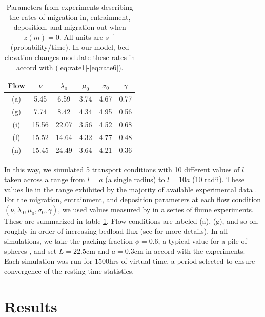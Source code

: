 \documentclass[draft]{agujournal2018}
\begin{document}
\begin{table}
	\caption{Parameters from \citet{Ancey2008} experiments describing the rates of migration in, entrainment, deposition, and migration out when $z(m)=0$. All units are $s^{-1}$ (probability/time). In our model, bed elevation changes modulate these rates in accord with (\ref{eq:rate1}-\ref{eq:rate6}).}\label{tab:anceyparams}
	\begin{tabular}{cccccc} \\ 
		\toprule  
		Flow & $\nu$ & $\lambda_0$ & $\mu_0$ & $\sigma_0$ & $\gamma$ \\
		\midrule
		(a) & 5.45  & 6.59  & 3.74 & 4.67 & 0.77 \\
		\midrule
		(g) & 7.74  & 8.42  & 4.34 & 4.95 & 0.56 \\
		\midrule
		(i) & 15.56 & 22.07 & 3.56 & 4.52 & 0.68 \\
		\midrule
		(l) & 15.52 & 14.64 & 4.32 & 4.77 & 0.48 \\
		\midrule
		(n) & 15.45 & 24.49 & 3.64 & 4.21 & 0.36 \\
		\bottomrule
	\end{tabular}
\end{table} 
In this way, we simulated 5 transport conditions with 10 different values of $l$ taken across a range from $l=a$ (a single radius) to $l=10a$ (10 radii).
These values lie in the range exhibited by the majority of available experimental data \citep{Wong2007,Singh2009,Martin2014}.
For the migration, entrainment, and deposition parameters at each flow condition $(\nu, \lambda_0, \mu_0, \sigma_0, \gamma)$, we used values measured by \citet{Ancey2008} in a series of flume experiments.
These are summarized in table \ref{tab:anceyparams}.
Flow conditions are labeled (a), (g), and so on, roughly in order of increasing bedload flux (see \citet{Ancey2008} for more details). 
In all simulations, we take the packing fraction $\phi = 0.6$, a typical value for a pile of spheres \citep[e.g.,][]{Bennett1972}, and set $L = 22.5$cm and $a = 0.3$cm in accord with the \citet{Ancey2008} experiments.
Each simulation was run for $1500$hrs of virtual time, a period selected to ensure convergence of the resting time statistics.

\section{Results}
\end{document}

